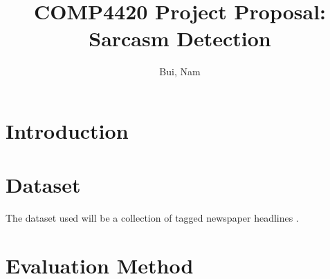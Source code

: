 \documentclass[11pt]{article}
\title{COMP4420 Project Proposal: Sarcasm Detection}
\author{
    Bui, Nam \\
    \email{nam\_bui@student.uml.edu}
}
\begin{document}
\maketitle

\section{Introduction}



\section{Dataset}

The dataset used will be a collection of
tagged newspaper headlines \cite{misra2023Sarcasm}.


\section{Evaluation Method}


\printbibliography
\end{document}
